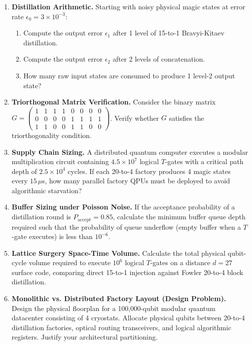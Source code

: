 \begin{enumerate}[label=\textbf{14.\arabic*.}]
    \item \textbf{Distillation Arithmetic.} Starting with noisy physical magic states at error rate $\epsilon_0 = 3 \times 10^{-3}$:
    \begin{enumerate}
        \item Compute the output error $\epsilon_1$ after 1 level of 15-to-1 Bravyi-Kitaev distillation.
        \item Compute the output error $\epsilon_2$ after 2 levels of concatenation.
        \item How many raw input states are consumed to produce 1 level-2 output state?
    \end{enumerate}
    
    \item \textbf{Triorthogonal Matrix Verification.} Consider the binary matrix $G = \begin{pmatrix} 1 & 1 & 1 & 1 & 0 & 0 & 0 & 0 \\ 0 & 0 & 0 & 0 & 1 & 1 & 1 & 1 \\ 1 & 1 & 0 & 0 & 1 & 1 & 0 & 0 \end{pmatrix}$. Verify whether $G$ satisfies the triorthogonality condition.
    
    \item \textbf{Supply Chain Sizing.} A distributed quantum computer executes a modular multiplication circuit containing $4.5 \times 10^7$ logical $T$-gates with a critical path depth of $2.5 \times 10^4$ cycles. If each 20-to-4 factory produces 4 magic states every $15\,\mu$s, how many parallel factory QPUs must be deployed to avoid algorithmic starvation?
    
    \item \textbf{Buffer Sizing under Poisson Noise.} If the acceptance probability of a distillation round is $P_{\text{accept}} = 0.85$, calculate the minimum buffer queue depth required such that the probability of queue underflow (empty buffer when a $T$-gate executes) is less than $10^{-6}$.
    
    \item \textbf{Lattice Surgery Space-Time Volume.} Calculate the total physical qubit-cycle volume required to execute $10^6$ logical $T$-gates on a distance $d = 27$ surface code, comparing direct 15-to-1 injection against Fowler 20-to-4 block distillation.
    
    \item \textbf{Monolithic vs. Distributed Factory Layout (Design Problem).} Design the physical floorplan for a 100,000-qubit modular quantum datacenter consisting of 4 cryostats. Allocate physical qubits between 20-to-4 distillation factories, optical routing transceivers, and logical algorithmic registers. Justify your architectural partitioning.
\end{enumerate}
